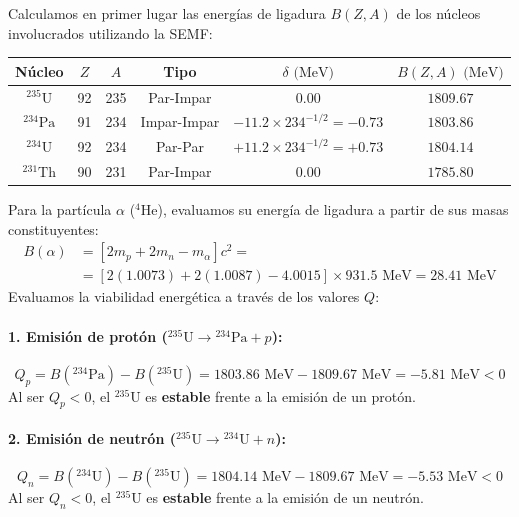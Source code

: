 \begin{problema}
Calculamos en primer lugar las energías de ligadura $B(Z,A)$ de los núcleos involucrados utilizando la SEMF:

\begin{center}
\begin{tabular}{cccccc}
\hline
Núcleo & $Z$ & $A$ & Tipo & $\delta\text{ (MeV)}$ & $B(Z,A)\text{ (MeV)}$ \\
\hline
${}^{235}\text{U}$ & 92 & 235 & Par-Impar & $0.00$ & $1809.67$ \\
${}^{234}\text{Pa}$ & 91 & 234 & Impar-Impar & $-11.2 \times 234^{-1/2} = -0.73$ & $1803.86$ \\
${}^{234}\text{U}$ & 92 & 234 & Par-Par & $+11.2 \times 234^{-1/2} = +0.73$ & $1804.14$ \\
${}^{231}\text{Th}$ & 90 & 231 & Par-Impar & $0.00$ & $1785.80$ \\
\hline
\end{tabular}
\end{center}

Para la partícula $\alpha$ (${}^4\text{He}$), evaluamos su energía de ligadura a partir de sus masas constituyentes:
\[
\begin{array}{rl}
    B(\alpha) & \displaystyle = \left[ 2 m_p + 2 m_n - m_\alpha \right] c^2 = \\[4pt]
    & \displaystyle = \left[ 2(1.0073) + 2(1.0087) - 4.0015 \right] \times 931.5\text{ MeV} = 28.41\text{ MeV}
\end{array}
\]
Evaluamos la viabilidad energética a través de los valores $Q$:

\paragraph{1. Emisión de protón (${}^{235}\text{U} \to {}^{234}\text{Pa} + p$):}
\begin{equation}
Q_p = B({}^{234}\text{Pa}) - B({}^{235}\text{U}) = 1803.86\text{ MeV} - 1809.67\text{ MeV} = -5.81\text{ MeV} < 0
\end{equation}
Al ser $Q_p < 0$, el ${}^{235}\text{U}$ es \textbf{estable} frente a la emisión de un protón.

\paragraph{2. Emisión de neutrón (${}^{235}\text{U} \to {}^{234}\text{U} + n$):}
\begin{equation}
Q_n = B({}^{234}\text{U}) - B({}^{235}\text{U}) = 1804.14\text{ MeV} - 1809.67\text{ MeV} = -5.53\text{ MeV} < 0
\end{equation}
Al ser $Q_n < 0$, el ${}^{235}\text{U}$ es \textbf{estable} frente a la emisión de un neutrón.


\end{problema}
